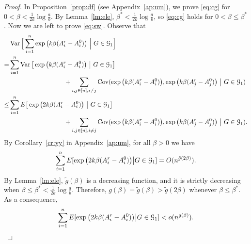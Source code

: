 \documentclass{article}
\begin{document}
\begin{proof}
In Proposition~\ref{prop:df} (see Appendix~\ref{ap:um}), we prove \eqref{eq:cg} for $0<\beta<\frac{1}{2k}\log\frac{a}{b}$. By Lemma~\ref{lm:ele}, $\beta^\ast<\frac{1}{2k}\log\frac{a}{b}$, so \eqref{eq:cg} holds for $0< \beta\le \beta^\ast$.
Now we are left to prove \eqref{eq:sw}. Observe that
\begin{equation} \label{eq:mh1}
\begin{aligned}
& \operatorname{Var} \Big[ \sum_{i=1}^n  \exp\big(k\beta (A^r_i-A^0_i) \big) ~\Big|~ G\in\mathcal{G}_1 \Big] \\
= & \sum_{i=1}^n  \operatorname{Var} \big[\exp\big(k\beta (A^r_i-A^0_i) \big) ~\big|~ G\in\mathcal{G}_1 \big] \\
& \hspace*{1.2in} + \sum_{i,j\in[n],i\neq j}
\operatorname{Cov}(\exp\big(k\beta (A^r_i-A^0_i) \big), \exp\big(k\beta (A^r_j-A^0_j) \big) ~\big|~ G\in\mathcal{G}_1 ) \\
\le & \sum_{i=1}^n E \big[ \exp\big(2k\beta (A^r_i-A^0_i) \big) ~\big|~ G\in\mathcal{G}_1 \big] \\
& \hspace*{1.2in} + \sum_{i,j\in[n],i\neq j}
\operatorname{Cov}(\exp\big(k\beta (A^r_i-A^0_i) \big), \exp\big(k\beta (A^r_j-A^0_j) \big) ~\big|~ G\in\mathcal{G}_1) .
\end{aligned}
\end{equation}
By Corollary~\ref{cr:yy} in Appendix~\ref{ap:um}, for all $\beta>0$ we have
$$
\sum_{i=1}^n E[ \exp\big(2k\beta (A^r_i-A^0_i) \big) \big| G\in\mathcal{G}_1]
= O ( n^{\tilde{g}(2\beta)} ) .
$$
By Lemma~\ref{lm:ele}, $\tilde{g}(\beta)$ is a decreasing function, and it is strictly decreasing when $\beta\le\beta^\ast<\frac{1}{2k}\log\frac{a}{b}$. Therefore, $g(\beta)=\tilde{g}(\beta)>\tilde{g}(2\beta)$ whenever $\beta\le\beta^\ast$. As a consequence, 
\begin{equation} \label{eq:mh2}
\sum_{i=1}^n E[ \exp\big(2k\beta (A^r_i-A^0_i) \big) \big| G\in\mathcal{G}_1]
< o ( n^{g(\beta)} ) .
\end{equation}




\end{proof}
\end{document}
